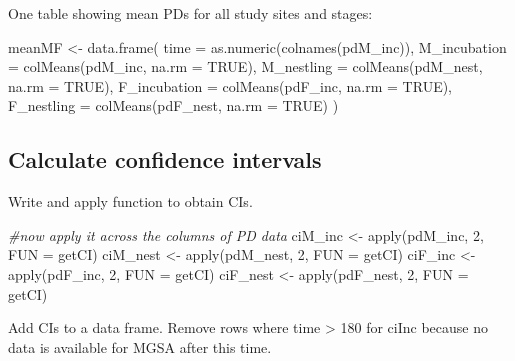 \documentclass[
]{article}
\newenvironment{Shaded}{\begin{snugshade}}{\end{snugshade}}
\newcommand{\AttributeTok}[1]{\textcolor[rgb]{0.77,0.63,0.00}{#1}}
\newcommand{\CommentTok}[1]{\textcolor[rgb]{0.56,0.35,0.01}{\textit{#1}}}
\newcommand{\ConstantTok}[1]{\textcolor[rgb]{0.00,0.00,0.00}{#1}}
\newcommand{\DecValTok}[1]{\textcolor[rgb]{0.00,0.00,0.81}{#1}}
\newcommand{\FunctionTok}[1]{\textcolor[rgb]{0.00,0.00,0.00}{#1}}
\newcommand{\NormalTok}[1]{#1}
\newcommand{\OtherTok}[1]{\textcolor[rgb]{0.56,0.35,0.01}{#1}}
\begin{document}
One table showing mean PDs for all study sites and stages:

\begin{Shaded}
\begin{Highlighting}[]
\NormalTok{meanMF }\OtherTok{\textless{}{-}} \FunctionTok{data.frame}\NormalTok{(}
  \AttributeTok{time =} \FunctionTok{as.numeric}\NormalTok{(}\FunctionTok{colnames}\NormalTok{(pdM\_inc)),}
  \AttributeTok{M\_incubation =} \FunctionTok{colMeans}\NormalTok{(pdM\_inc, }\AttributeTok{na.rm =} \ConstantTok{TRUE}\NormalTok{),}
  \AttributeTok{M\_nestling =} \FunctionTok{colMeans}\NormalTok{(pdM\_nest, }\AttributeTok{na.rm =} \ConstantTok{TRUE}\NormalTok{),}
  \AttributeTok{F\_incubation =} \FunctionTok{colMeans}\NormalTok{(pdF\_inc, }\AttributeTok{na.rm =} \ConstantTok{TRUE}\NormalTok{),}
  \AttributeTok{F\_nestling =} \FunctionTok{colMeans}\NormalTok{(pdF\_nest, }\AttributeTok{na.rm =} \ConstantTok{TRUE}\NormalTok{)}
\NormalTok{)}
\end{Highlighting}
\end{Shaded}

\hypertarget{calculate-confidence-intervals}{%
\subsection{Calculate confidence
intervals}\label{calculate-confidence-intervals}}

Write and apply function to obtain CIs.

\begin{Shaded}
\begin{Highlighting}[]
\CommentTok{\#now apply it across the columns of PD data}
\NormalTok{ciM\_inc }\OtherTok{\textless{}{-}} \FunctionTok{apply}\NormalTok{(pdM\_inc, }\DecValTok{2}\NormalTok{, }\AttributeTok{FUN =}\NormalTok{ getCI)}
\NormalTok{ciM\_nest }\OtherTok{\textless{}{-}} \FunctionTok{apply}\NormalTok{(pdM\_nest, }\DecValTok{2}\NormalTok{, }\AttributeTok{FUN =}\NormalTok{ getCI)}
\NormalTok{ciF\_inc }\OtherTok{\textless{}{-}} \FunctionTok{apply}\NormalTok{(pdF\_inc, }\DecValTok{2}\NormalTok{, }\AttributeTok{FUN =}\NormalTok{ getCI)}
\NormalTok{ciF\_nest }\OtherTok{\textless{}{-}} \FunctionTok{apply}\NormalTok{(pdF\_nest, }\DecValTok{2}\NormalTok{, }\AttributeTok{FUN =}\NormalTok{ getCI)}
\end{Highlighting}
\end{Shaded}

Add CIs to a data frame. Remove rows where time \textgreater{} 180 for
ciInc because no data is available for MGSA after this time.
\end{document}
